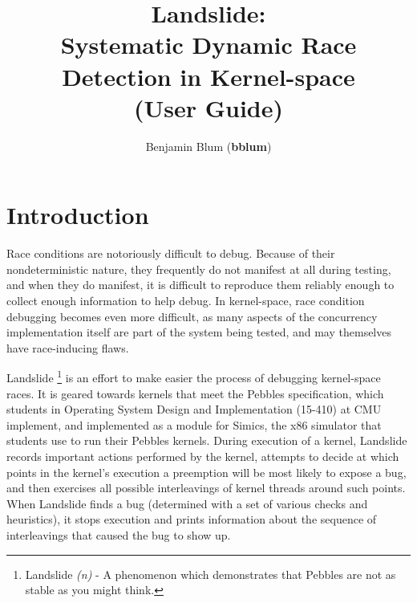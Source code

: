 \documentclass{article}
\begin{document}
\captionsetup{width=.75\textwidth,font=small,labelfont=bf}
\title{\bf Landslide: \\ Systematic Dynamic Race Detection in Kernel-space \\ (User Guide)}
\author{Benjamin Blum (\textbf{bblum})}
\maketitle

\newcommand\true{\;\textit{true}}
\newcommand\false{\;\textit{false}}

\newcommand\alpher\alpha
\newcommand\beter\beta
\newcommand\gammer\gamma
\newcommand\delter\delta
\newcommand\zeter\zeta
\newcommand\Sigmer\Sigma

\newcommand\NN{\mathbb{N}}
\newcommand\QQ{\mathbb{Q}}
\newcommand\RR{\mathbb{R}}
\newcommand\ZZ{\mathbb{Z}}

\begin{abstract}
\end{abstract}

\section{Introduction}

Race conditions are notoriously difficult to debug.
Because of their nondeterministic nature, they frequently do not manifest at all during testing, and when they do manifest, it is difficult to reproduce them reliably enough to collect enough information to help debug.
In kernel-space, race condition debugging becomes even more difficult, as many aspects of the concurrency implementation itself are part of the system being tested, and may themselves have race-inducing flaws.

Landslide
\footnote{Landslide {\em (n)} - A phenomenon which demonstrates that Pebbles are not as stable as you might think.}
is an effort to make easier the process of debugging kernel-space races.
It is geared towards kernels that meet the Pebbles specification, which students in Operating System Design and Implementation (15-410) at CMU implement, and implemented as a module for Simics, the x86 simulator that students use to run their Pebbles kernels.
During execution of a kernel, Landslide records important actions performed by the kernel, attempts to decide at which points in the kernel's execution a preemption will be most likely to expose a bug, and then exercises all possible interleavings of kernel threads around such points.
When Landslide finds a bug (determined with a set of various checks and heuristics), it stops execution and prints information about the sequence of interleavings that caused the bug to show up.
\end{document}
